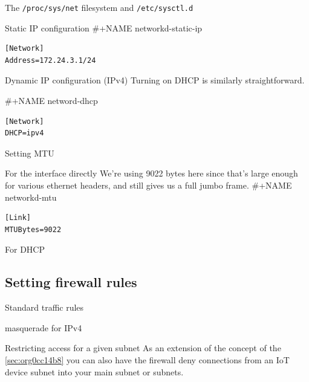 \documentclass[bigger]{beamer}
\begin{document}
\begin{frame}[fragile,label={sec:org6f2d154}]{The \texttt{/proc/sys/net} filesystem and \texttt{/etc/sysctl.d}}
\begin{block}{Static IP configuration}
\#+NAME networkd-static-ip
\begin{verbatim}
[Network]
Address=172.24.3.1/24
\end{verbatim}
\end{block}

\begin{block}{Dynamic IP configuration (IPv4)}
Turning on DHCP is similarly straightforward.

\#+NAME netword-dhcp
\begin{verbatim}
[Network]
DHCP=ipv4
\end{verbatim}
\end{block}
\end{frame}

\begin{frame}[fragile,label={sec:orge0b857e}]{Setting MTU}
 \begin{block}{For the interface directly}
     We're using 9022 bytes here since that's large enough for various ethernet
     headers, and still gives us a full jumbo frame.
\#+NAME networkd-mtu
\begin{verbatim}
[Link]
MTUBytes=9022
\end{verbatim}
\end{block}

\begin{block}{For DHCP}
\end{block}
\end{frame}


\subsection{Setting firewall rules}
\label{sec:org6569745}

\begin{frame}[label={sec:org2862f08}]{Standard traffic rules}
\begin{block}{masquerade for IPv4}
\end{block}

\begin{block}{Restricting access for a given subnet}
As an extension of the concept of the \ref{sec:org0cc14b8} you can also
have the firewall deny connections from an IoT device subnet into your main
subnet or subnets.
\end{block}
\end{frame}
\end{document}
